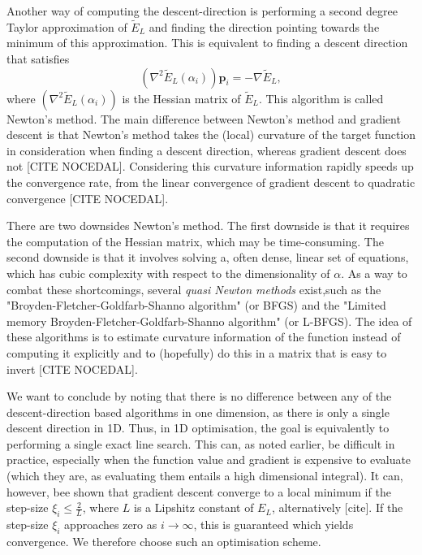 \documentclass[11pt,a4paper]{article}
\numberwithin{equation}{section}
\begin{document}
Another way of computing the descent-direction is performing a second degree Taylor approximation of $\tilde{E}_L$ and finding the direction pointing towards the minimum of this approximation. This is equivalent to finding a descent direction that satisfies
\begin{equation}
    (\nabla^2 \tilde{E}_L(\alpha_i))\bm{p}_i = -\nabla \tilde{E}_L,
\end{equation}
where $(\nabla^2 \tilde{E}_L(\alpha_i))$ is the Hessian matrix of $\tilde{E}_L$. This algorithm is called Newton's method. The main difference between Newton's method and gradient descent is that Newton's method takes the (local) curvature of the target function in consideration when finding a descent direction, whereas gradient descent does not [CITE NOCEDAL]. Considering this curvature information rapidly speeds up the convergence rate, from the linear convergence of gradient descent to quadratic convergence [CITE NOCEDAL].

There are two downsides Newton's method. The first downside is that it requires the computation of the Hessian matrix, which may be time-consuming. The second downside is that it involves solving a, often dense, linear set of equations, which has cubic complexity with respect to the dimensionality of $\alpha$. As a way to combat these shortcomings, several \emph{quasi Newton methods} exist,such as the "Broyden-Fletcher-Goldfarb-Shanno algorithm" (or BFGS) and the "Limited memory Broyden-Fletcher-Goldfarb-Shanno algorithm" (or L-BFGS). The idea of these algorithms is to estimate curvature information of the function instead of computing it explicitly and to (hopefully) do this in a matrix that is easy to invert [CITE NOCEDAL].

We want to conclude by noting that there is no difference between any of the descent-direction based algorithms in one dimension, as there is only a single descent direction in 1D. Thus, in 1D optimisation, the goal is equivalently to performing a single exact line search. This can, as noted earlier, be difficult in practice, especially when the function value and gradient is expensive to evaluate (which they are, as evaluating them entails a high dimensional integral). It can, however, bee shown that gradient descent converge to a local minimum if the step-size $\xi_i \leq \frac{2}{L}$, where $L$ is a Lipshitz constant of $E_L$, alternatively [cite]. If the step-size $\xi_i$ approaches zero as $i \to \infty$, this is guaranteed which yields convergence. We therefore choose such an optimisation scheme.
\end{document}
